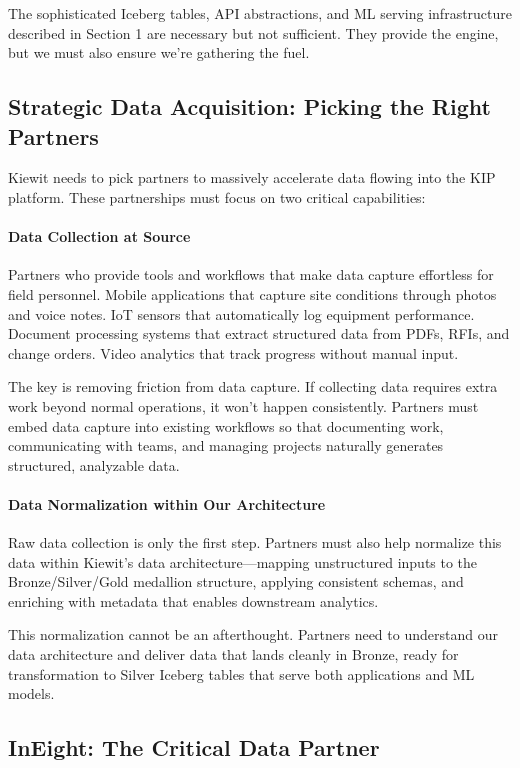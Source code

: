 \documentclass[12pt, a4paper]{article}
\begin{document}
The sophisticated Iceberg tables, API abstractions, and ML serving infrastructure described in Section 1 are necessary but not sufficient. They provide the engine, but we must also ensure we're gathering the fuel.

\subsection{Strategic Data Acquisition: Picking the Right Partners}

Kiewit needs to pick partners to massively accelerate data flowing into the KIP platform. These partnerships must focus on two critical capabilities:

\paragraph{Data Collection at Source}
Partners who provide tools and workflows that make data capture effortless for field personnel. Mobile applications that capture site conditions through photos and voice notes. IoT sensors that automatically log equipment performance. Document processing systems that extract structured data from PDFs, RFIs, and change orders. Video analytics that track progress without manual input.

The key is removing friction from data capture. If collecting data requires extra work beyond normal operations, it won't happen consistently. Partners must embed data capture into existing workflows so that documenting work, communicating with teams, and managing projects naturally generates structured, analyzable data.

\paragraph{Data Normalization within Our Architecture}
Raw data collection is only the first step. Partners must also help normalize this data within Kiewit's data architecture—mapping unstructured inputs to the Bronze/Silver/Gold medallion structure, applying consistent schemas, and enriching with metadata that enables downstream analytics.

This normalization cannot be an afterthought. Partners need to understand our data architecture and deliver data that lands cleanly in Bronze, ready for transformation to Silver Iceberg tables that serve both applications and ML models.

\subsection{InEight: The Critical Data Partner}
\end{document}
